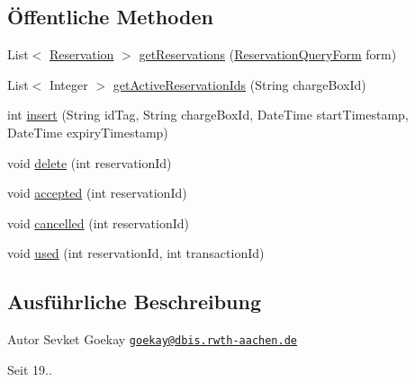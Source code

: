 \subsection*{Öffentliche Methoden}
\begin{DoxyCompactItemize}
\item 
List$<$ \hyperlink{classde_1_1rwth_1_1idsg_1_1steve_1_1repository_1_1dto_1_1_reservation}{Reservation} $>$ \hyperlink{interfacede_1_1rwth_1_1idsg_1_1steve_1_1repository_1_1_reservation_repository_ab80103ca7c1c6511e6b05246e7fcfbbb}{get\+Reservations} (\hyperlink{classde_1_1rwth_1_1idsg_1_1steve_1_1web_1_1dto_1_1_reservation_query_form}{Reservation\+Query\+Form} form)
\item 
List$<$ Integer $>$ \hyperlink{interfacede_1_1rwth_1_1idsg_1_1steve_1_1repository_1_1_reservation_repository_aefb53c3222e0d5f36e3aa7ac3a91b40c}{get\+Active\+Reservation\+Ids} (String charge\+Box\+Id)
\item 
int \hyperlink{interfacede_1_1rwth_1_1idsg_1_1steve_1_1repository_1_1_reservation_repository_aba723f89f7144b70a16335df5c57f4ea}{insert} (String id\+Tag, String charge\+Box\+Id, Date\+Time start\+Timestamp, Date\+Time expiry\+Timestamp)
\item 
void \hyperlink{interfacede_1_1rwth_1_1idsg_1_1steve_1_1repository_1_1_reservation_repository_a269c1973292847a6485237b4449a5f5c}{delete} (int reservation\+Id)
\item 
void \hyperlink{interfacede_1_1rwth_1_1idsg_1_1steve_1_1repository_1_1_reservation_repository_a839cd195bc1fa9893a32ac760b3353b0}{accepted} (int reservation\+Id)
\item 
void \hyperlink{interfacede_1_1rwth_1_1idsg_1_1steve_1_1repository_1_1_reservation_repository_a25403a1b68112eba0b41633addfa98ca}{cancelled} (int reservation\+Id)
\item 
void \hyperlink{interfacede_1_1rwth_1_1idsg_1_1steve_1_1repository_1_1_reservation_repository_a0e4c6205a4b4e61d9076401a36483d4e}{used} (int reservation\+Id, int transaction\+Id)
\end{DoxyCompactItemize}


\subsection{Ausführliche Beschreibung}
\begin{DoxyAuthor}{Autor}
Sevket Goekay \href{mailto:goekay@dbis.rwth-aachen.de}{\tt goekay@dbis.\+rwth-\/aachen.\+de} 
\end{DoxyAuthor}
\begin{DoxySince}{Seit}
19.. 
\end{DoxySince}


